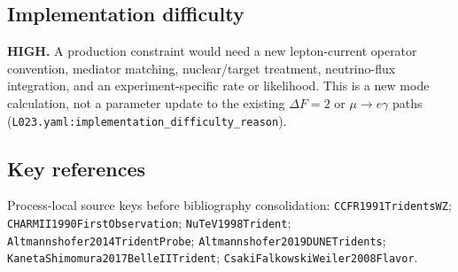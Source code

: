 \subsection*{Implementation difficulty}
\textbf{HIGH.}  A production constraint would need a new lepton-current
operator convention, mediator matching, nuclear/target treatment, neutrino-flux
integration, and an experiment-specific rate or likelihood.  This is a new mode
calculation, not a parameter update to the existing \(\Delta F=2\) or
\(\mu\to e\gamma\) paths
(\texttt{L023.yaml:implementation\_difficulty\_reason}).

\subsection*{Key references}
Process-local source keys before bibliography consolidation:
\texttt{CCFR1991TridentsWZ}; \texttt{CHARMII1990FirstObservation};
\texttt{NuTeV1998Trident}; \texttt{Altmannshofer2014TridentProbe};
\texttt{Altmannshofer2019DUNETridents};
\texttt{KanetaShimomura2017BelleIITrident};
\texttt{CsakiFalkowskiWeiler2008Flavor}.
